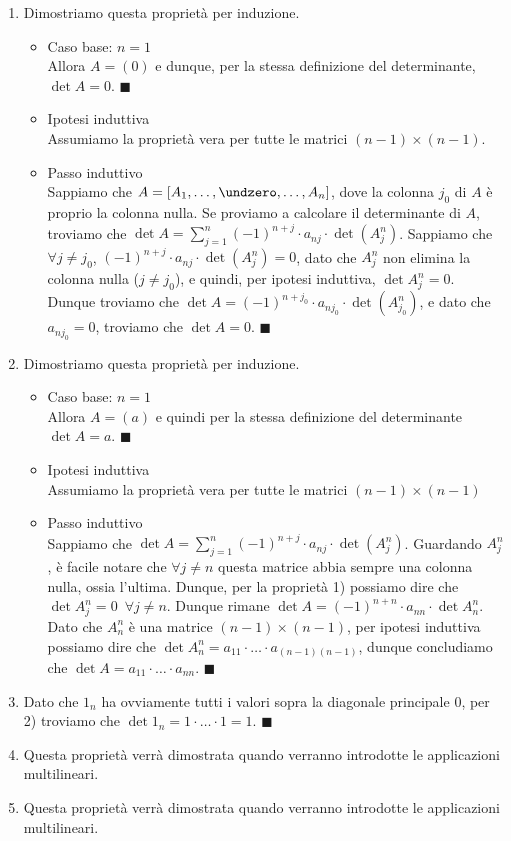 \documentclass[11pt, a4paper, titlepage, oneside]{scrbook}
\begin{document}
\begin{enumerate}
    \item Dimostriamo questa proprietà per induzione.
    \begin{itemize}
        \item Caso base: $n = 1$ \\
        Allora $A = (0)$ e dunque, per la stessa definizione del determinante, $\det A = 0$. $\blacksquare$
        \item Ipotesi induttiva \\
        Assumiamo la proprietà vera per tutte le matrici $(n-1) \times (n-1)$.
        \item Passo induttivo \\
        Sappiamo che $A = [A_1, \ldots, \undzero, \ldots, A_n]$, dove la colonna $j_0$ di $A$ è proprio la colonna nulla. Se proviamo a calcolare il determinante di $A$, troviamo che \mbox{$\det A = \sum_{j = 1}^n (-1)^{n+j} \cdot a_{nj} \cdot \det(A_j^n)$}. Sappiamo che $\forall j \neq j_0$, $(-1)^{n+j} \cdot a_{nj} \cdot \det(A_j^n) = 0$, dato che $A_j^n$ non elimina la colonna nulla ($j \neq j_0$), e quindi, per ipotesi induttiva, $\det A_j^n = 0$. Dunque troviamo che $\det A = (-1)^{n+j_0} \cdot a_{n j_0} \cdot \det(A^n_{j_0})$, e dato che $a_{n j_0} = 0$, troviamo che $\det A = 0$. $\blacksquare$
    \end{itemize}
    \item Dimostriamo questa proprietà per induzione.
    \begin{itemize}
        \item Caso base: $n = 1$ \\
        Allora $A = (a)$ e quindi per la stessa definizione del determinante $\det A = a$. $\blacksquare$
        \item Ipotesi induttiva \\
        Assumiamo la proprietà vera per tutte le matrici $(n-1) \times (n-1)$
        \item Passo induttivo \\
        Sappiamo che $\det A = \sum_{j = 1}^n (-1)^{n+j} \cdot a_{nj} \cdot \det(A^n_j)$. Guardando $A_j^n$, è facile notare che $\forall j \neq n$ questa matrice abbia sempre una colonna nulla, ossia l'ultima. Dunque, per la proprietà 1) possiamo dire che $\det A_j^n = 0 \enspace \forall j \neq n$. Dunque rimane \mbox{$\det A = (-1)^{n+n} \cdot a_{nn} \cdot \det A_n^n$}. Dato che $A_n^n$ è una matrice $(n-1) \times (n-1)$, per ipotesi induttiva possiamo dire che $\det A_n^n = a_{11} \cdot \ldots \cdot a_{(n-1)(n-1)}$, dunque concludiamo che \mbox{$\det A = a_{11} \cdot \ldots \cdot a_{nn}$}. $\blacksquare$
    \end{itemize}
    \item Dato che $1_n$ ha ovviamente tutti i valori sopra la diagonale principale $0$, per 2) troviamo che \mbox{$\det 1_n = 1 \cdot \ldots \cdot 1 = 1$}. $\blacksquare$
    \item Questa proprietà verrà dimostrata quando verranno introdotte le applicazioni multilineari.
    \item Questa proprietà verrà dimostrata quando verranno introdotte le applicazioni multilineari.
\end{enumerate}
\end{document}
